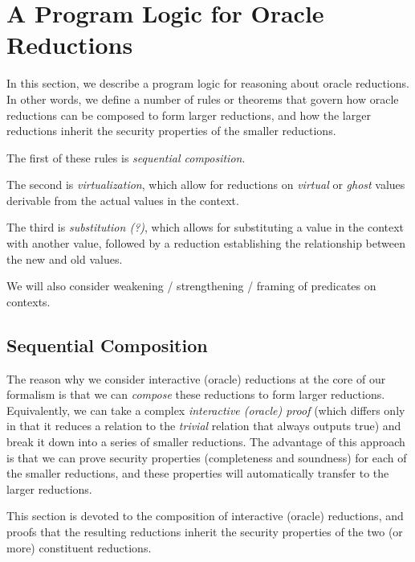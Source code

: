 
\section{A Program Logic for Oracle Reductions}

In this section, we describe a program logic for reasoning about oracle reductions. In other words, we define a number of rules or theorems that govern how oracle reductions can be composed to form larger reductions, and how the larger reductions inherit the security properties of the smaller reductions.

The first of these rules is \emph{sequential composition}.

The second is \emph{virtualization}, which allow for reductions on \emph{virtual} or \emph{ghost} values derivable from the actual values in the context.

The third is \emph{substitution (?)}, which allows for substituting a value in the context with another value, followed by a reduction establishing the relationship between the new and old values.

We will also consider weakening / strengthening / framing of predicates on contexts.

\subsection{Sequential Composition}

The reason why we consider interactive (oracle) reductions at the core of our formalism is that we
can \emph{compose} these reductions to form larger reductions. Equivalently, we can take a complex
\emph{interactive (oracle) proof} (which differs only in that it reduces a relation to the
\emph{trivial} relation that always outputs true) and break it down into a series of smaller
reductions. The advantage of this approach is that we can prove security properties (completeness
and soundness) for each of the smaller reductions, and these properties will automatically transfer
to the larger reductions.

This section is devoted to the composition of interactive (oracle) reductions, and proofs that the
resulting reductions inherit the security properties of the two (or more) constituent reductions.



